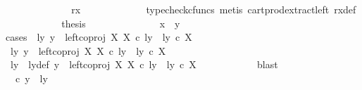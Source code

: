 \begin{isabellebody}
\ \ \ \ \ \ \ \ \isamarkupfalse%
\ \isamarkupfalse%
\ {\isachardoublequoteopen}{\isachardot}{\kern0pt}{\isachardot}{\kern0pt}{\isachardot}{\kern0pt}\ {\isacharequal}{\kern0pt}\ {\isasymlangle}rx{\isacharcomma}{\kern0pt}\ {\isasymf}{\isasymrangle}{\isachardoublequoteclose}\isanewline
\ \ \ \ \ \ \ \ \ \ \isamarkupfalse%
\ {\isacharparenleft}{\kern0pt}typecheck{\isacharunderscore}{\kern0pt}cfuncs{\isacharcomma}{\kern0pt}\ metis\ cart{\isacharunderscore}{\kern0pt}prod{\isacharunderscore}{\kern0pt}extract{\isacharunderscore}{\kern0pt}left\ rx{\isacharunderscore}{\kern0pt}def{\isacharparenright}{\kern0pt}\isanewline
\ \ \ \ \ \ \ \ \isamarkupfalse%
\ \isamarkupfalse%
\ {\isacharquery}{\kern0pt}thesis\isacommand{{\isachardot}{\kern0pt}}\isamarkupfalse%
\isanewline
\ \ \ \ \ \ \isamarkupfalse%
\isanewline
\ \ \ \ \ \ \isamarkupfalse%
\ {\isachardoublequoteopen}x\ {\isacharequal}{\kern0pt}\ y{\isachardoublequoteclose}\isanewline
\ \ \ \ \ \ \isamarkupfalse%
{\isacharparenleft}{\kern0pt}cases\ {\isachardoublequoteopen}{\isasymexists}\ ly{\isachardot}{\kern0pt}\ y\ {\isacharequal}{\kern0pt}\ left{\isacharunderscore}{\kern0pt}coproj\ X\ X\ {\isasymcirc}\isactrlsub c\ ly\ {\isasymand}\ ly\ {\isasymin}\isactrlsub c\ X{\isachardoublequoteclose}{\isacharparenright}{\kern0pt}\isanewline
\ \ \ \ \ \ \ \ \isamarkupfalse%
\ {\isachardoublequoteopen}{\isasymexists}ly{\isachardot}{\kern0pt}\ y\ {\isacharequal}{\kern0pt}\ left{\isacharunderscore}{\kern0pt}coproj\ X\ X\ {\isasymcirc}\isactrlsub c\ ly\ {\isasymand}\ ly\ {\isasymin}\isactrlsub c\ X{\isachardoublequoteclose}\isanewline
\ \ \ \ \ \ \ \ \isamarkupfalse%
\ \isamarkupfalse%
\ ly\ \ ly{\isacharunderscore}{\kern0pt}def{\isacharcolon}{\kern0pt}\ {\isachardoublequoteopen}y\ {\isacharequal}{\kern0pt}\ left{\isacharunderscore}{\kern0pt}coproj\ X\ X\ {\isasymcirc}\isactrlsub c\ ly\ {\isasymand}\ ly\ {\isasymin}\isactrlsub c\ X{\isachardoublequoteclose}\isanewline
\ \ \ \ \ \ \ \ \ \ \isamarkupfalse%
\ blast\isanewline
\ \ \ \ \ \ \ \ \isamarkupfalse%
\ {\isachardoublequoteopen}{\isasymrho}\ {\isasymcirc}\isactrlsub c\ y\ {\isacharequal}{\kern0pt}\ {\isasymlangle}ly{\isacharcomma}{\kern0pt}\ {\isasymt}{\isasymrangle}{\isachardoublequoteclose}\isanewline
\ \ \ \ \ \ \ \ \isamarkupfalse%
\ {\isacharminus}{\kern0pt}\ \isanewline
\ \ \ \ \ \ \ \ \ \ \isamarkupfalse%

\end{isabellebody}
